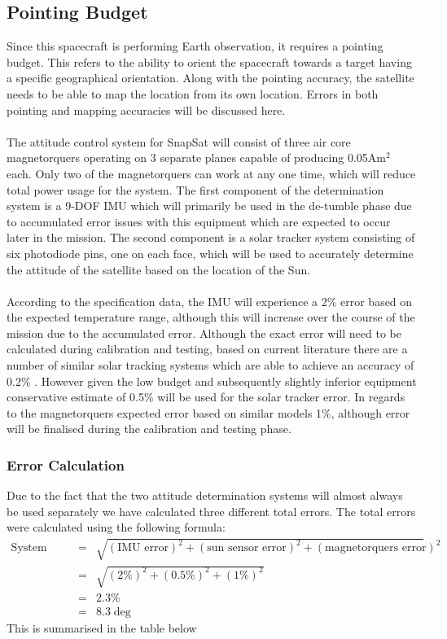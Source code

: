 \subsection{Pointing Budget}

Since this spacecraft is performing Earth observation, it requires a pointing budget. This refers to the ability to orient the spacecraft towards a target having a specific geographical orientation. Along with the pointing accuracy, the satellite needs to be able to map the location from its own location. Errors in both pointing and mapping accuracies will be discussed here. \\
\\\noindent
The attitude control system for SnapSat will consist of three air core magnetorquers operating on 3 separate planes capable of producing 0.05Am$^2$ each.  Only two of the magnetorquers can work at any one time, which will reduce total power usage for the system.  The first component of the determination system is a 9-DOF IMU which will primarily be used in the de-tumble phase due to accumulated error issues with this equipment which are expected to occur later in the mission.  The second component is a solar tracker system consisting of six photodiode pins, one on each face, which will be used to accurately determine the attitude of the satellite based on the location of the Sun. \\
\\\noindent
According to the specification data, the IMU will experience a 2\% error based on the expected temperature range, although this will increase over the course of the mission due to the accumulated error.  Although the exact error will need to be calculated during calibration and testing, based on current literature there are a number of similar solar tracking systems which are able to achieve an accuracy of 0.2\% \cite{beaudette}.  However given the low budget and subsequently slightly inferior equipment conservative estimate of 0.5\% will be used for the solar tracker error.  In regards to the magnetorquers expected error based on similar models 1\%, although error will be finalised during the calibration and testing phase.
\subsubsection{Error Calculation}
Due to the fact that the two attitude determination systems will almost always be used separately we have calculated three different total errors. The total errors were calculated using the following formula:
\begin{eqnarray}
\text{System Error} &=& \sqrt{(\text{IMU error})^2+(\text{sun sensor error})^2+(\text{magnetorquers error})^2} \\
&=& \sqrt{(2\%)^2+(0.5\%)^2+(1\%)^2} \\
&=& 2.3\% \\
&=& 8.3\deg
\end{eqnarray}
This is summarised in the table below

